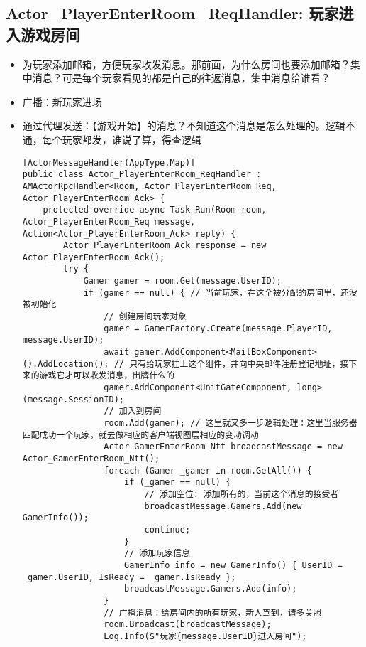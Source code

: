 \documentclass[9pt, b5paper]{article}
\begin{document}
\subsection{Actor\_PlayerEnterRoom\_ReqHandler: 玩家进入游戏房间}
\label{sec-1-6}
\begin{itemize}
\item 为玩家添加邮箱，方便玩家收发消息。那前面，为什么房间也要添加邮箱？集中消息？可是每个玩家看见的都是自己的往返消息，集中消息给谁看？
\item 广播：新玩家进场
\item 通过代理发送：【游戏开始】的消息？不知道这个消息是怎么处理的。逻辑不通，每个玩家都发，谁说了算，得查逻辑
\begin{verbatim}
[ActorMessageHandler(AppType.Map)]
public class Actor_PlayerEnterRoom_ReqHandler : AMActorRpcHandler<Room, Actor_PlayerEnterRoom_Req, Actor_PlayerEnterRoom_Ack> {
    protected override async Task Run(Room room, Actor_PlayerEnterRoom_Req message, Action<Actor_PlayerEnterRoom_Ack> reply) {
        Actor_PlayerEnterRoom_Ack response = new Actor_PlayerEnterRoom_Ack();
        try {
            Gamer gamer = room.Get(message.UserID);
            if (gamer == null) { // 当前玩家，在这个被分配的房间里，还没被初始化
                // 创建房间玩家对象
                gamer = GamerFactory.Create(message.PlayerID, message.UserID);
                await gamer.AddComponent<MailBoxComponent>().AddLocation(); // 只有给玩家挂上这个组件，并向中央邮件注册登记地址，接下来的游戏它才可以收发消息，出牌什么的
                gamer.AddComponent<UnitGateComponent, long>(message.SessionID);
                // 加入到房间
                room.Add(gamer); // 这里就又多一步逻辑处理：这里当服务器匹配成功一个玩家，就去做相应的客户端视图层相应的变动调动
                Actor_GamerEnterRoom_Ntt broadcastMessage = new Actor_GamerEnterRoom_Ntt();
                foreach (Gamer _gamer in room.GetAll()) {
                    if (_gamer == null) {
                        // 添加空位: 添加所有的，当前这个消息的接受者
                        broadcastMessage.Gamers.Add(new GamerInfo());
                        continue;
                    }
                    // 添加玩家信息
                    GamerInfo info = new GamerInfo() { UserID = _gamer.UserID, IsReady = _gamer.IsReady };
                    broadcastMessage.Gamers.Add(info);
                }
                // 广播消息：给房间内的所有玩家，新人驾到，请多关照
                room.Broadcast(broadcastMessage);
                Log.Info($"玩家{message.UserID}进入房间");

\end{verbatim}
\end{itemize}
\end{document}
